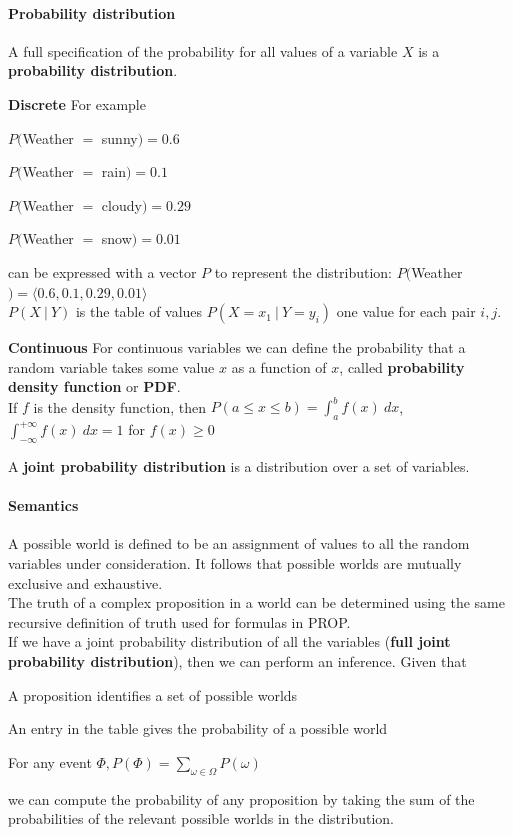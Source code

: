 \documentclass[10pt]{report}
\begin{document}
\paragraph{Probability distribution} A full specification of the probability for all values of a variable $X$ is a \textbf{probability distribution}.
\begin{list}{}{}
	\item \textbf{Discrete} For example
	\begin{list}{}{}
		\item $P($Weather $=$ sunny$)=0.6$
		\item $P($Weather $=$ rain$)=0.1$
		\item $P($Weather $=$ cloudy$)=0.29$
		\item $P($Weather $=$ snow$)=0.01$
	\end{list}
	can be expressed with a vector $P$ to represent the distribution: $P($Weather$) = \langle 0.6,0.1,0.29,0.01\rangle$\\
	$P(X\:|\:Y)$ is the table of values $P(X=x_1\:|\:Y=y_i)$ one value for each pair $i,j$.
	\item \textbf{Continuous} For continuous variables we can define the probability that a random variable takes some value $x$ as a function of $x$, called \textbf{probability density function} or \textbf{PDF}.\\
	If $f$ is the density function, then $P(a\leq x\leq b) = \int_a^b f(x)\:dx$, $\int_{-\infty}^{+\infty} f(x)\:dx = 1$ for $f(x)\geq 0$
\end{list}
A \textbf{joint probability distribution} is a distribution over a set of variables.
\paragraph{Semantics} A possible world is defined to be an assignment of values to all the random variables under consideration. It follows that possible worlds are mutually exclusive and exhaustive.\\
The truth of a complex proposition in a world can be determined using the same recursive definition of truth used for formulas in PROP.\\
If we have a joint probability distribution of all the variables (\textbf{full joint probability distribution}), then we can perform an inference. Given that
\begin{list}{}{}
	\item A proposition identifies a set of possible worlds
	\item An entry in the table gives the probability of a possible world
	\item For any event $\Phi, P(\Phi) = \sum_{\omega\in\Omega} P(\omega)$
\end{list}
we can compute the probability of any proposition by taking the sum of the probabilities of the relevant possible worlds in the distribution.
\end{document}
